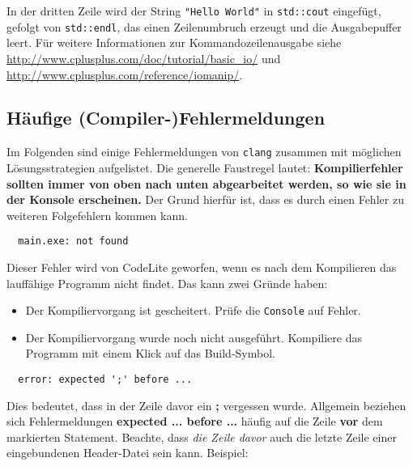 In der dritten Zeile wird der String \lstinline{"Hello World"} in \lstinline{std::cout} eingefügt, gefolgt von \lstinline{std::endl}, das einen Zeilenumbruch erzeugt und die Ausgabepuffer leert. Für weitere Informationen zur Kommandozeilenausgabe siehe \url{http://www.cplusplus.com/doc/tutorial/basic_io/} und \url{http://www.cplusplus.com/reference/iomanip/}.


\subsection*{Häufige (Compiler-)Fehlermeldungen}

Im Folgenden sind einige Fehlermeldungen von \texttt{clang} zusammen mit möglichen Lösungsstrategien aufgelistet.
Die generelle Faustregel lautet: 
\textbf{Kompilierfehler sollten immer von oben nach unten abgearbeitet werden, so wie sie in der Konsole erscheinen.}
Der Grund hierfür ist, dass es durch einen Fehler zu weiteren Folgefehlern kommen kann.


\begin{verbatim}
  main.exe: not found
\end{verbatim}

Dieser Fehler wird von CodeLite geworfen, wenn es nach dem Kompilieren das lauffähige Programm nicht findet.
Das kann zwei Gründe haben:
\begin{itemize}
\item Der Kompiliervorgang ist gescheitert. Prüfe die \texttt{Console} auf Fehler.
\item Der Kompiliervorgang wurde noch nicht ausgeführt. Kompiliere das Programm mit einem Klick auf das Build-Symbol.
\end{itemize}

\begin{verbatim}
  error: expected ';' before ...
\end{verbatim}

Dies bedeutet, dass in der Zeile davor ein \textbf{;} vergessen wurde.
Allgemein beziehen sich Fehlermeldungen \textbf{expected ... before ...} häufig auf die Zeile \textbf{vor} dem markierten Statement.
Beachte, dass \emph{die Zeile davor} auch die letzte Zeile einer eingebundenen Header-Datei sein kann. Beispiel:

